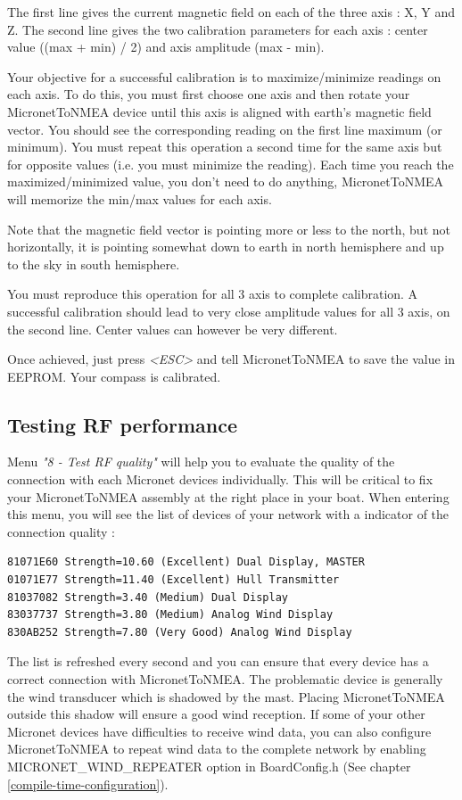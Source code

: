 \documentclass{report}
\begin{document}
The first line gives the current magnetic field on each of the three axis : X, Y and Z.
The second line gives the two calibration parameters for each axis : center value ((max + min) / 2) and axis amplitude (max - min).

Your objective for a successful calibration is to maximize/minimize readings on each axis. To do this, you must first choose one axis and then rotate your MicronetToNMEA device until this axis is aligned with earth's magnetic field vector. You should see the corresponding reading on the first line maximum (or minimum).
You must repeat this operation a second time for the same axis but for opposite values (i.e. you must minimize the reading). Each time you reach the maximized/minimized value, you don't need to do anything, MicronetToNMEA will memorize the min/max values for each axis.

Note that the magnetic field vector is pointing more or less to the north, but not horizontally, it is pointing somewhat down to earth in north hemisphere and up to the sky in south hemisphere.

You must reproduce this operation for all 3 axis to complete calibration.
A successful calibration should lead to very close amplitude values for all 3 axis, on the second line. Center values can however be very different.

Once achieved, just press \emph{<ESC>} and tell MicronetToNMEA to save the value in EEPROM. Your compass is calibrated.

\subsection{Testing RF performance}

Menu \emph{"8 - Test RF quality"} will help you to evaluate the quality of the connection with each Micronet devices individually. This will be critical to fix your MicronetToNMEA assembly at the right place in your boat. When entering this menu, you will see the list of devices of your network with a indicator of the connection quality :

\begin{verbatim}
81071E60 Strength=10.60 (Excellent) Dual Display, MASTER
01071E77 Strength=11.40 (Excellent) Hull Transmitter
81037082 Strength=3.40 (Medium) Dual Display
83037737 Strength=3.80 (Medium) Analog Wind Display
830AB252 Strength=7.80 (Very Good) Analog Wind Display
\end{verbatim}

The list is refreshed every second and you can ensure that every device has a correct connection with MicronetToNMEA. The problematic device is generally the wind transducer which is shadowed by the mast. Placing MicronetToNMEA outside this shadow will ensure a good wind reception. If some of your other Micronet devices have difficulties to receive wind data, you can also configure MicronetToNMEA to repeat wind data to the complete network by enabling MICRONET\_WIND\_REPEATER option in BoardConfig.h (See chapter \ref{compile-time-configuration}).
\end{document}
